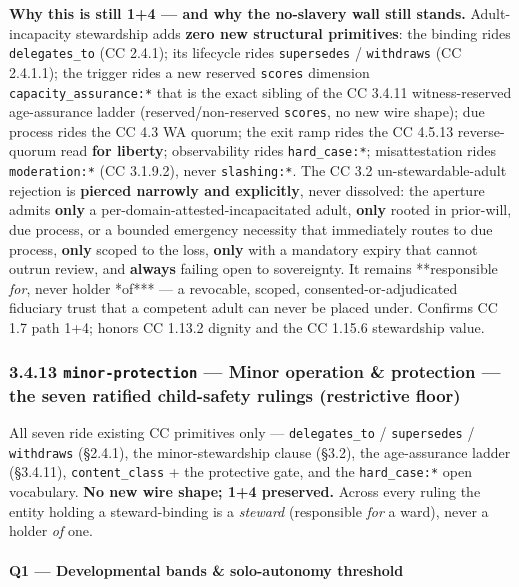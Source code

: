 \documentclass[11pt]{article}
\begin{document}
\textbf{Why this is still 1+4 — and why the no-slavery wall still stands.} Adult-incapacity stewardship adds \textbf{zero new structural primitives}: the binding rides \texttt{delegates\_to} (CC 2.4.1); its lifecycle rides \texttt{supersedes} / \texttt{withdraws} (CC 2.4.1.1); the trigger rides a new reserved \texttt{scores} dimension \texttt{capacity\_assurance:*} that is the exact sibling of the CC 3.4.11 witness-reserved age-assurance ladder (reserved/non-reserved \texttt{scores}, no new wire shape); due process rides the CC 4.3 WA quorum; the exit ramp rides the CC 4.5.13 reverse-quorum read \textbf{for liberty}; observability rides \texttt{hard\_case:*}; misattestation rides \texttt{moderation:*} (CC 3.1.9.2), never \texttt{slashing:*}. The CC 3.2 un-stewardable-adult rejection is \textbf{pierced narrowly and explicitly}, never dissolved: the aperture admits \textbf{only} a per-domain-attested-incapacitated adult, \textbf{only} rooted in prior-will, due process, or a bounded emergency necessity that immediately routes to due process, \textbf{only} scoped to the loss, \textbf{only} with a mandatory expiry that cannot outrun review, and \textbf{always} failing open to sovereignty. It remains **responsible \textit{for}, never holder *of*** — a revocable, scoped, consented-or-adjudicated fiduciary trust that a competent adult can never be placed under. Confirms CC 1.7 path 1+4; honors CC 1.13.2 dignity and the CC 1.15.6 stewardship value.


\subsubsection*{3.4.13 \texttt{minor-protection} — Minor operation \& protection — the seven ratified child-safety rulings (restrictive floor)}


All seven ride existing CC primitives only — \texttt{delegates\_to} / \texttt{supersedes} / \texttt{withdraws} (§2.4.1), the minor-stewardship clause (§3.2), the age-assurance ladder (§3.4.11), \texttt{content\_class} + the protective gate, and the \texttt{hard\_case:*} open vocabulary. \textbf{No new wire shape; 1+4 preserved.} Across every ruling the entity holding a steward-binding is a \textit{steward} (responsible \textit{for} a ward), never a holder \textit{of} one.



\paragraph{Q1 — Developmental bands \& solo-autonomy threshold}\mbox{}\\
\end{document}
